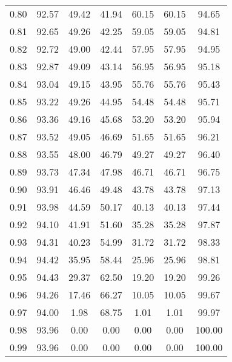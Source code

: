 \begin{tabular}{|c|c|c|c|c|c|c|}
      0.80 &     92.57 &     49.42 &      41.94 &   60.15 &      60.15 &         94.65 \\
      0.81 &     92.65 &     49.26 &      42.25 &   59.05 &      59.05 &         94.81 \\
      0.82 &     92.72 &     49.00 &      42.44 &   57.95 &      57.95 &         94.95 \\
      0.83 &     92.87 &     49.09 &      43.14 &   56.95 &      56.95 &         95.18 \\
      0.84 &     93.04 &     49.15 &      43.95 &   55.76 &      55.76 &         95.43 \\
      0.85 &     93.22 &     49.26 &      44.95 &   54.48 &      54.48 &         95.71 \\
      0.86 &     93.36 &     49.16 &      45.68 &   53.20 &      53.20 &         95.94 \\
      0.87 &     93.52 &     49.05 &      46.69 &   51.65 &      51.65 &         96.21 \\
      0.88 &     93.55 &     48.00 &      46.79 &   49.27 &      49.27 &         96.40 \\
      0.89 &     93.73 &     47.34 &      47.98 &   46.71 &      46.71 &         96.75 \\
      0.90 &     93.91 &     46.46 &      49.48 &   43.78 &      43.78 &         97.13 \\
      0.91 &     93.98 &     44.59 &      50.17 &   40.13 &      40.13 &         97.44 \\
      0.92 &     94.10 &     41.91 &      51.60 &   35.28 &      35.28 &         97.87 \\
      0.93 &     94.31 &     40.23 &      54.99 &   31.72 &      31.72 &         98.33 \\
      0.94 &     94.42 &     35.95 &      58.44 &   25.96 &      25.96 &         98.81 \\
      0.95 &     94.43 &     29.37 &      62.50 &   19.20 &      19.20 &         99.26 \\
      0.96 &     94.26 &     17.46 &      66.27 &   10.05 &      10.05 &         99.67 \\
      0.97 &     94.00 &      1.98 &      68.75 &    1.01 &       1.01 &         99.97 \\
      0.98 &     93.96 &      0.00 &       0.00 &    0.00 &       0.00 &        100.00 \\
      0.99 &     93.96 &      0.00 &       0.00 &    0.00 &       0.00 &        100.00 \\
\bottomrule
\end{tabular}
